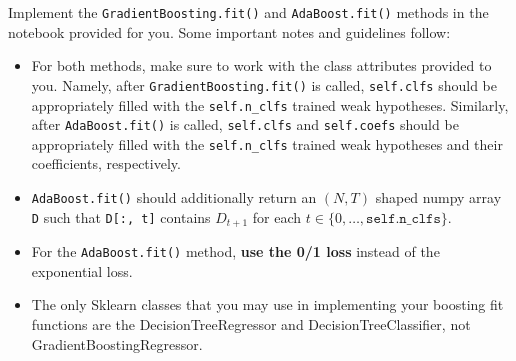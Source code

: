 \begin{problem}[14]
    Implement the \texttt{GradientBoosting.fit()} and \texttt{AdaBoost.fit()} methods in the notebook provided for you. Some important notes and guidelines follow:
    \begin{itemize}
        \item For both methods, make sure to work with the class attributes provided to you. Namely, after \texttt{GradientBoosting.fit()} is called, \texttt{self.clfs} should be appropriately filled with the \texttt{self.n_clfs} trained weak hypotheses. Similarly, after \texttt{AdaBoost.fit()} is called, \texttt{self.clfs} and \texttt{self.coefs} should be appropriately filled with the \texttt{self.n_clfs} trained weak hypotheses and their coefficients, respectively.
        \item \texttt{AdaBoost.fit()} should additionally return an $(N, T)$ shaped numpy array \texttt{D} such that \texttt{D[:, t]} contains $D_{t+1}$ for each $t \in \{0, \ldots, \texttt{self.n_clfs}\}$.
        \item For the \texttt{AdaBoost.fit()} method, \textbf{use the 0/1 loss} instead of the exponential loss.
	\item The only Sklearn classes that you may use in implementing your boosting fit functions are the DecisionTreeRegressor and DecisionTreeClassifier, not GradientBoostingRegressor.
    \end{itemize}
\end{problem}

